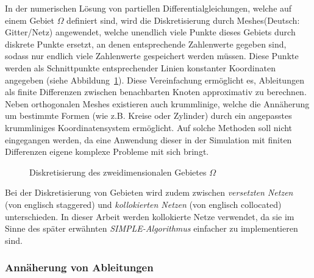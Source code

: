 In der numerischen Lösung von partiellen Differentialgleichungen, welche auf einem Gebiet $\Omega$ definiert sind, wird die Diskretisierung durch \glqq Meshes\grqq (Deutsch: Gitter/Netz) angewendet, welche unendlich viele Punkte dieses Gebiets durch diskrete Punkte ersetzt, an denen entsprechende Zahlenwerte gegeben sind, sodass nur endlich viele Zahlenwerte gespeichert werden müssen. Diese Punkte werden als Schnittpunkte entsprechender Linien konstanter Koordinaten angegeben (siehe Abbildung~\ref{fig:meshs}). Diese Vereinfachung ermöglicht es, Ableitungen als finite Differenzen zwischen benachbarten Knoten approximativ zu berechnen. Neben orthogonalen Meshes existieren auch krummlinige, welche die Annäherung um bestimmte Formen (wie z.B. Kreise oder Zylinder) durch ein angepasstes krummliniges Koordinatensystem ermöglicht. Auf solche Methoden soll nicht eingegangen werden, da eine Anwendung dieser in der Simulation mit finiten Differenzen eigene komplexe Probleme mit sich bringt.
\begin{figure}
    \centering
    \def\svgwidth{0.75\textwidth}
    
    \caption{Diskretisierung des zweidimensionalen Gebietes $\Omega$}
    \label{fig:meshs}
\end{figure}
Bei der Diskretisierung von Gebieten wird zudem zwischen \emph{versetzten Netzen} (von englisch \glqq staggered\grqq) und \emph{kollokierten Netzen} (von englisch \glqq collocated\grqq) unterschieden. In dieser Arbeit werden kollokierte Netze verwendet, da sie im Sinne des später erwähnten \emph{SIMPLE-Algorithmus} einfacher zu implementieren sind.

\subsubsection{Annäherung von Ableitungen}

\label{sec:abl_approx}

